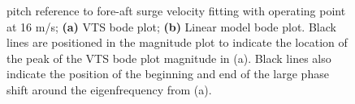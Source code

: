 \begin{figure}[ht]
	\centering
	
	\hfil
	
	\caption{pitch reference to fore-aft surge velocity fitting with operating point at 16 m/s; \textbf{(a)} VTS bode plot; \textbf{(b)} Linear model bode plot. Black lines are positioned in the magnitude plot to indicate the location of the peak of the VTS bode plot magnitude in (a). Black lines also indicate the position of the beginning and end of the large phase shift around the eigenfrequency from (a).}
	\label{fig:wref-vy_16}
\end{figure}


